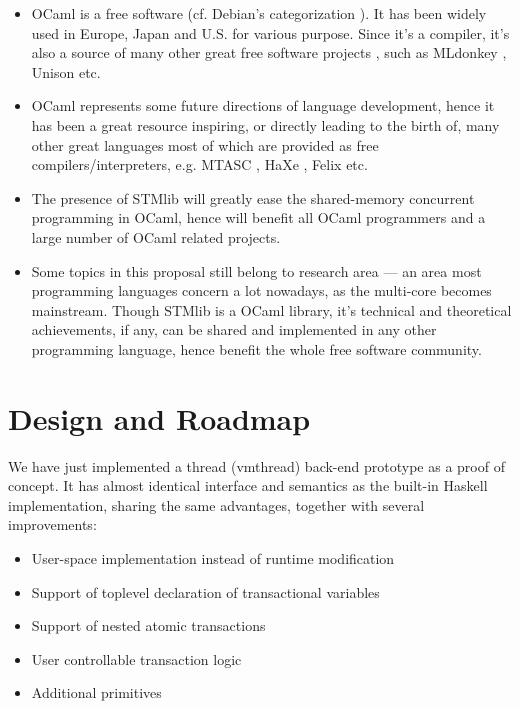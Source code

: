 \documentclass{article}
\begin{document}
\begin{itemize}

\item OCaml is a free software (cf. Debian's categorization \cite{Debian}). It
  has been widely used in Europe, Japan and U.S. for various purpose. Since
  it's a compiler, it's also a source of many other great free software
  projects \cite{OCamlProjects}, such as MLdonkey \cite{MLdonkey}, Unison
  \cite{Unison} etc.
\item OCaml represents some future directions of language development, hence it
  has been a great resource inspiring, or directly leading to the birth of, many
  other great languages most of which are provided as free
  compilers/interpreters, e.g. MTASC \cite{MTASC}, HaXe \cite{HaXe}, Felix
  \cite{Felix} etc. 
\item The presence of STMlib will greatly ease the shared-memory concurrent
  programming in OCaml, hence will benefit all OCaml programmers and a large
  number of OCaml related projects.
\item Some topics in this proposal still belong to research area --- an area
  most programming languages concern a lot nowadays, as the multi-core
  becomes mainstream. Though STMlib is a OCaml library, it's technical
  and theoretical achievements, if any, can be shared and implemented in any
  other programming language, hence benefit the whole free software community.
\end{itemize}



\section{Design and Roadmap}

We have just implemented a thread (vmthread) back-end prototype \cite{STMlib}
as a proof of concept. It has almost identical interface and semantics as the
built-in Haskell implementation, sharing the same advantages, together with
several improvements:

\begin{itemize}
  \item User-space implementation instead of runtime modification
  \item Support of toplevel declaration of transactional variables
  \item Support of nested atomic transactions
  \item User controllable transaction logic
  \item Additional primitives
\end{itemize}
\end{document}
